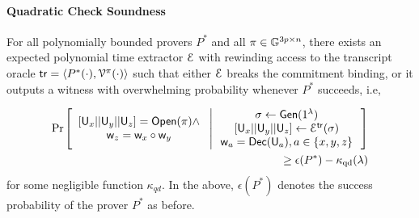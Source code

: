 \paragraph*{Quadratic Check Soundness}
\begin{lemma}[Soundness]\label{lem:quadcheck_sound}
	For all polynomially bounded provers $P^\ast$ and all $\pi\in \mathbb{G}^{3p\times n}$,
	there exists an expected polynomial time extractor $\mathcal{E}$ with rewinding access
	to the transcript oracle $\mathsf{tr}=\langle P^\ast(\cdot),\mathcal{V}^{\pi}(\cdot)\rangle$
	such that either $\mathcal{E}$ breaks the commitment binding, or it outputs a witness
	with overwhelming probability whenever $P^\ast$ succeeds, i.e,
	
	{\footnotesize
		\begin{align*}
		\condprob{
			\begin{array}{c}
			{[}\ewit_x||\ewit_y||\ewit_z{]}=\open(\pi)\wedge \\
			\wit_z=\wit_x\circ\wit_y
			\end{array}
		}{
			\begin{array}{c}
			\sigma %
			\leftarrow \gen(\secparam) \\
			{[}\ewit_x||\ewit_y||\ewit_z{]}%
			\leftarrow \extr^{\mathsf{tr}}(\sigma) \\ 
			\wit_a=\dec(\ewit_a), a\in \{x,y,z\}
			\end{array}
		}\\
		\geq \epsilon(P^\ast) - \kappa_{\rm qd}(\secpar)
		\end{align*}
	}
	for some negligible function $\kappa_{qd}$. In the above, $\epsilon(P^\ast)$
	denotes the success probability of the prover $P^\ast$ as before.
\end{lemma}
